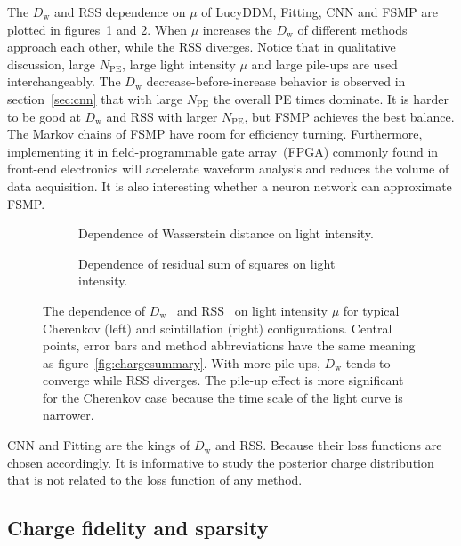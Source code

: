 The $D_\mathrm{w}$ and RSS dependence on $\mu$ of LucyDDM, Fitting, CNN and FSMP are plotted in figures~\ref{fig:wdistsummary} and \ref{fig:rsssummary}.  When $\mu$ increases the $D_\mathrm{w}$ of different methods approach each other, while the RSS diverges.  Notice that in qualitative discussion, large $N_\mathrm{PE}$, large light intensity $\mu$ and large pile-ups are used interchangeably.  The $D_\mathrm{w}$ decrease-before-increase behavior is observed in section~\ref{sec:cnn} that with large $N_\mathrm{PE}$ the overall PE times dominate.  It is harder to be good at $D_\mathrm{w}$ and RSS with larger $N_\mathrm{PE}$, but FSMP achieves the best balance.  The Markov chains of FSMP have room for efficiency turning.  Furthermore, implementing it in field-programmable gate array~(FPGA) commonly found in front-end electronics will accelerate waveform analysis and reduces the volume of data acquisition.  It is also interesting whether a neuron network can approximate FSMP.
\begin{figure}[H]
  \begin{subfigure}[b]{\textwidth}
    \resizebox{\textwidth}{!}{}
    \caption{\label{fig:wdistsummary}Dependence of Wasserstein distance on light intensity.}
  \end{subfigure}

  \vspace{0.5em}
  \begin{subfigure}[b]{\textwidth}
    \resizebox{\textwidth}{!}{}
    \caption{\label{fig:rsssummary}Dependence of residual sum of squares on light intensity.}
  \end{subfigure}
  \caption{\label{fig:summary}The dependence of $D_\mathrm{w}$~ and RSS~ on light intensity $\mu$ for typical Cherenkov (left) and scintillation (right) configurations.  Central points, error bars and method abbreviations have the same meaning as figure~\ref{fig:chargesummary}.  With more pile-ups, $D_\mathrm{w}$ tends to converge while RSS diverges.  The pile-up effect is more significant for the Cherenkov case because the time scale of the light curve is narrower. }
\end{figure}

CNN and Fitting are the kings of $D_\mathrm{w}$ and RSS.  Because their loss functions are chosen accordingly.  It is informative to study the posterior charge distribution that is not related to the loss function of any method.

\subsection{Charge fidelity and sparsity}

